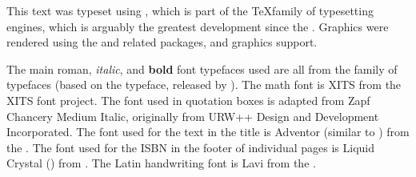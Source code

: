 {\sffamily
This text was typeset using \hi{\XeLaTeX},
which is part of the \TeX family of typesetting engines, 
which is arguably the greatest development since the .
Graphics were rendered using the  and related packages, and \hi{\LaTeX} graphics support.

The main {\rmfamily roman}, {\itshape italic}, and {\bfseries bold} font typefaces used 
are all from the  family of typefaces
(based on the  typeface, released by ).
The math font is {{\fntXits XITS}} from the {{\fntXits XITS font project}}.
The font used in quotation boxes is adapted from {\fntZapf Zapf Chancery Medium Italic},
originally from URW++ Design and Development Incorporated.
The font used for the text in the title is {\fntAdventor Adventor} (similar to ) from the .
The font used for the ISBN in the footer of individual pages is 
\mbox{\fntDigital\footnotesize Liquid} \mbox{\fntDigital\footnotesize Crystal} 
() from .
The Latin handwriting font is {\fntLavi Lavi} from the .

}
